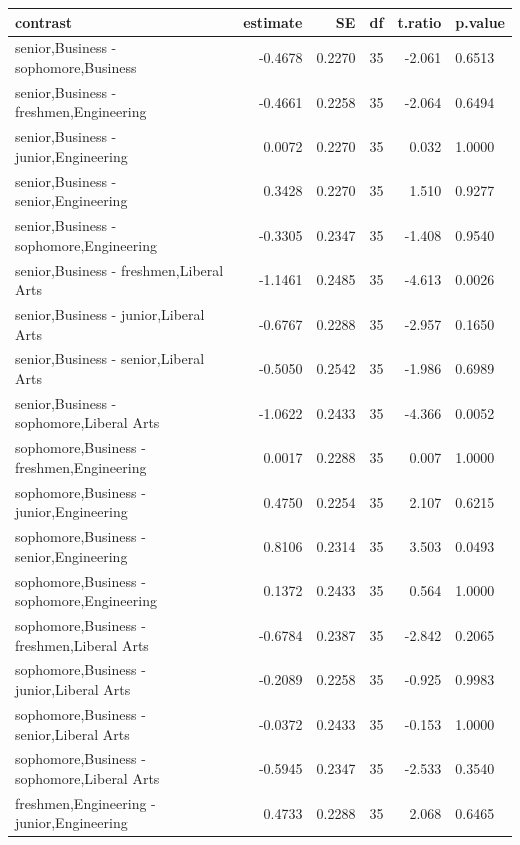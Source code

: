 \documentclass{article} %
\begin{document}
\begin{table}[H]
	\centering
	\begin{tabular}{|l|r|r|r|r|l|}
		\hline
		contrast & estimate & SE & df & t.ratio & p.value \\ 
		\hline 
		senior,Business - sophomore,Business & -0.4678 & 0.2270 & 35 & -2.061 & 0.6513 \\ 
		senior,Business - freshmen,Engineering & -0.4661 & 0.2258 & 35 & -2.064 & 0.6494 \\ 
		senior,Business - junior,Engineering & 0.0072 & 0.2270 & 35 & 0.032 & 1.0000 \\ 
		senior,Business - senior,Engineering & 0.3428 & 0.2270 & 35 & 1.510 & 0.9277 \\ 
		senior,Business - sophomore,Engineering & -0.3305 & 0.2347 & 35 & -1.408 & 0.9540 \\ 
		senior,Business - freshmen,Liberal Arts & -1.1461 & 0.2485 & 35 & -4.613 & 0.0026 \\ 
		senior,Business - junior,Liberal Arts & -0.6767 & 0.2288 & 35 & -2.957 & 0.1650 \\ 
		senior,Business - senior,Liberal Arts & -0.5050 & 0.2542 & 35 & -1.986 & 0.6989 \\ 
		senior,Business - sophomore,Liberal Arts & -1.0622 & 0.2433 & 35 & -4.366 & 0.0052 \\ 
		sophomore,Business - freshmen,Engineering & 0.0017 & 0.2288 & 35 & 0.007 & 1.0000 \\ 
		sophomore,Business - junior,Engineering & 0.4750 & 0.2254 & 35 & 2.107 & 0.6215 \\ 
		sophomore,Business - senior,Engineering & 0.8106 & 0.2314 & 35 & 3.503 & 0.0493 \\ 
		sophomore,Business - sophomore,Engineering & 0.1372 & 0.2433 & 35 & 0.564 & 1.0000 \\ 
		sophomore,Business - freshmen,Liberal Arts & -0.6784 & 0.2387 & 35 & -2.842 & 0.2065 \\ 
		sophomore,Business - junior,Liberal Arts & -0.2089 & 0.2258 & 35 & -0.925 & 0.9983 \\ 
		sophomore,Business - senior,Liberal Arts & -0.0372 & 0.2433 & 35 & -0.153 & 1.0000 \\ 
		sophomore,Business - sophomore,Liberal Arts & -0.5945 & 0.2347 & 35 & -2.533 & 0.3540 \\ 
		freshmen,Engineering - junior,Engineering & 0.4733 & 0.2288 & 35 & 2.068 & 0.6465 \\ 

\end{tabular}
\end{table}
\end{document}
